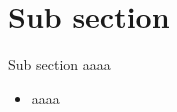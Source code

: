 \section[Sub section]{Sub section}

\begin{frame}{Sub section}
    aaaa
    \begin{itemize}
        \item aaaa
    \end{itemize}
\end{frame}
